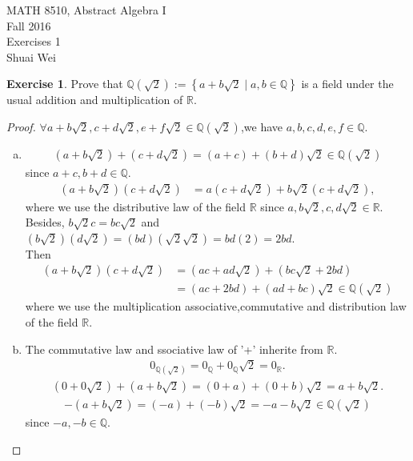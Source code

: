 \documentclass{amsart}
\newcommand{\bbr}{\mathbb{R}}
\newcommand{\bbq}{\mathbb{Q}}
\theoremstyle{plain}
\theoremstyle{definition}
\newtheorem{exer}[lem]{Exercise}
\begin{document}
\noindent MATH 8510, Abstract Algebra I \\
Fall 2016\\
Exercises 1\\
Shuai Wei
\

%
%

\begin{exer}
Prove that $\bbq(\sqrt 2):=\left\{a+b\sqrt 2\mid a,b\in\bbq\right\}$ is a field under the usual
addition and multiplication of $\bbr$.
\end{exer}
\begin{proof}
	$\forall a+b\sqrt 2, c+d\sqrt 2, e+f\sqrt 2\in \bbq(\sqrt 2)$,we have $a,b,c,d,e,f \in \bbq$.
		\begin{enumerate}[(a)]
			\item 
				\begin{align*}
					(a+b\sqrt 2) +( c+ d \sqrt 2) = (a+c) + (b+d)\sqrt 2 \in \bbq(\sqrt 2) 
				\end{align*}
				since $a+c, b+d \in \bbq$.
				\begin{align*}
					(a+b\sqrt 2)( c+ d \sqrt 2)&=a(c + d \sqrt 2) + b\sqrt 2(c+d\sqrt 2),
				\end{align*}
				where we use the distributive law of the field $\bbr$ since $a,b\sqrt 2, c,  d\sqrt 2 \in \bbr$. Besides, $b\sqrt 2 c = bc\sqrt 2$ and  $(b\sqrt 2)(d\sqrt 2) = (bd)(\sqrt 2\sqrt 2) = bd(2) = 2bd$.\\ 
				Then 
				\begin{align*}
					(a+b\sqrt 2)( c+ d \sqrt 2)  &= (ac +ad\sqrt 2) + (bc\sqrt 2 + 2bd) \\ & = (ac+2bd) + (ad+bc)\sqrt 2\in \bbq(\sqrt 2)
				\end{align*}
				where we use the multiplication associative,commutative and distribution law of the field $\bbr$. 
			\item 
			  The commutative law and ssociative law of '+' inherite from $\bbr$. 
				\begin{align*}
				0_{\bbq(\sqrt 2)} = 0_{\bbq} + 0_{\bbq}\sqrt 2 = 0_\bbr.
				\end{align*}
				\begin{align*}
				(0+0\sqrt 2) + (a+b\sqrt 2) = (0+a) + (0+b)\sqrt 2 = a + b\sqrt 2.
				\end{align*}
				\begin{align*}
				-(a+b\sqrt 2) = (-a)+(-b)\sqrt 2 = -a-b\sqrt 2 \in \bbq(\sqrt 2)
				\end{align*}
				since $-a,-b \in \bbq$. \\

\end{enumerate}
\end{proof}
\end{document}
